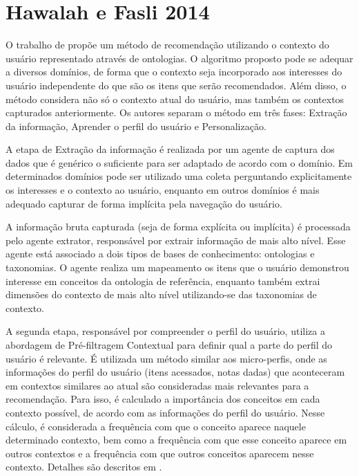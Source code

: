 \section{Hawalah e Fasli 2014}

O trabalho de  propõe um método de recomendação utilizando o contexto do usuário
representado através de ontologias. O algoritmo proposto pode se adequar a diversos domínios, de forma que o contexto
seja incorporado aos interesses do usuário independente do que são os itens que serão recomendados. Além disso, o método
considera não só o contexto atual do usuário, mas também os contextos capturados anteriormente. Os autores separam o
método em três fases: Extração da informação, Aprender o perfil do usuário e Personalização.

A etapa de Extração da informação é realizada por um agente de captura dos dados que é genérico o suficiente para ser
adaptado de acordo com o domínio. Em determinados domínios pode ser utilizado uma coleta perguntando explicitamente os
interesses e o contexto ao usuário, enquanto em outros domínios é mais adequado capturar de forma implícita pela
navegação do usuário.

A informação bruta capturada (seja de forma explícita ou implícita) é processada pelo agente extrator, responsável por
extrair informação de mais alto nível. Esse agente está associado a dois tipos de bases de conhecimento: ontologias e
taxonomias. O agente realiza um mapeamento os itens que o usuário demonstrou interesse em conceitos da ontologia de
referência, enquanto também extrai dimensões do contexto de mais alto nível utilizando-se das taxonomias de contexto.

A segunda etapa, responsável por compreender o perfil do usuário, utiliza a abordagem de Pré-filtragem Contextual para
definir qual a parte do perfil do usuário é relevante. É utilizada um método similar aos micro-perfis, onde as
informações do perfil do usuário (itens acessados, notas dadas) que aconteceram em contextos similares ao atual são
consideradas mais relevantes para a recomendação. Para isso, é calculado a importância dos conceitos em cada contexto
possível, de acordo com as informações do perfil do usuário. Nesse cálculo, é considerada a frequência com que o
conceito aparece naquele determinado contexto, bem como a frequência com que esse conceito aparece em outros contextos
e a frequência com que outros conceitos aparecem nesse contexto. Detalhes são descritos em \cite{hawalah2014utilizing}.

